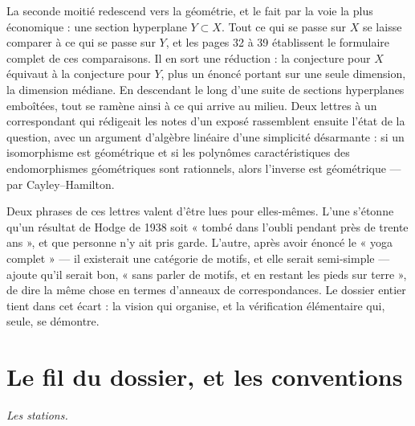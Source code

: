 \documentclass[11pt,a4paper]{article}
\begin{document}
\begin{resume}
La seconde moitié redescend vers la géométrie, et le fait par la voie la plus
économique : une section hyperplane $Y \subset X$. Tout ce qui se passe sur
$X$ se laisse comparer à ce qui se passe sur $Y$, et les pages 32 à 39
établissent le formulaire complet de ces comparaisons. Il en sort une
réduction : la conjecture pour $X$ équivaut à la conjecture pour $Y$, plus un
énoncé portant sur une seule dimension, la dimension médiane. En descendant le
long d'une suite de sections hyperplanes emboîtées, tout se ramène ainsi à ce
qui arrive au milieu. Deux lettres à un correspondant qui rédigeait les notes
d'un exposé rassemblent ensuite l'état de la question, avec un argument
d'algèbre linéaire d'une simplicité désarmante : si un isomorphisme est
géométrique et si les polynômes caractéristiques des endomorphismes
géométriques sont rationnels, alors l'inverse est géométrique --- par
Cayley--Hamilton.

Deux phrases de ces lettres valent d'être lues pour elles-mêmes. L'une
s'étonne qu'un résultat de Hodge de 1938 soit « tombé dans l'oubli pendant
près de trente ans », et que personne n'y ait pris garde. L'autre, après avoir
énoncé le « yoga complet » --- il existerait une catégorie de motifs, et elle
serait semi-simple --- ajoute qu'il serait bon, « sans parler de motifs, et en
restant les pieds sur terre », de dire la même chose en termes d'anneaux de
correspondances. Le dossier entier tient dans cet écart : la vision qui
organise, et la vérification élémentaire qui, seule, se démontre.

\end{resume}

\section*{Le fil du dossier, et les conventions}

\emph{Les stations.}
\end{document}
